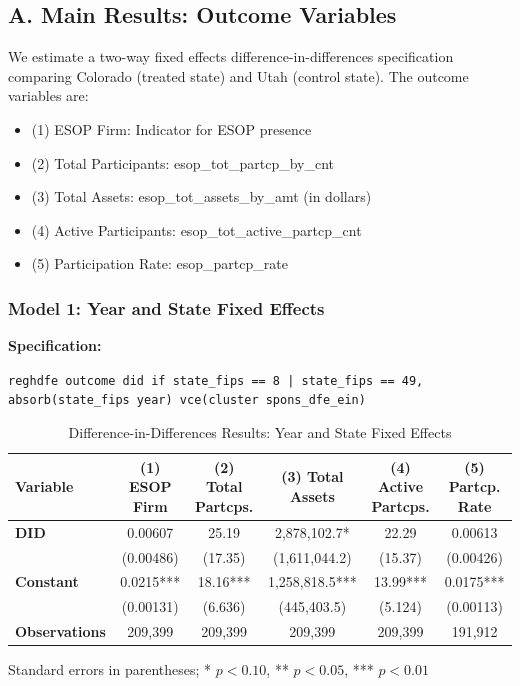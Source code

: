 \documentclass[12pt]{article}
\begin{document}
\subsection*{A. Main Results: Outcome Variables}

We estimate a two-way fixed effects difference-in-differences specification comparing Colorado (treated state) and Utah (control state). The outcome variables are:

\begin{itemize}
\item (1) ESOP Firm: Indicator for ESOP presence
\item (2) Total Participants: esop\_tot\_partcp\_by\_cnt
\item (3) Total Assets: esop\_tot\_assets\_by\_amt (in dollars)
\item (4) Active Participants: esop\_tot\_active\_partcp\_cnt
\item (5) Participation Rate: esop\_partcp\_rate
\end{itemize}

\subsubsection*{Model 1: Year and State Fixed Effects}

\textbf{Specification:}

\texttt{reghdfe outcome did if state\_fips == 8 | state\_fips == 49, \\ absorb(state\_fips year) vce(cluster spons\_dfe\_ein)}
\begin{table}[H]
\centering
\caption{Difference-in-Differences Results: Year and State Fixed Effects}
\label{tab:model1}
\footnotesize

\begin{tabular}{lccccc}
\toprule
Variable & (1) ESOP Firm & (2) Total Partcps. & (3) Total Assets & (4) Active Partcps. & (5) Partcp. Rate \\
\midrule
\textbf{DID} & 0.00607 & 25.19 & 2,878,102.7* & 22.29 & 0.00613 \\
             & (0.00486) & (17.35) & (1,611,044.2) & (15.37) & (0.00426) \\
\textbf{Constant} & 0.0215*** & 18.16*** & 1,258,818.5*** & 13.99*** & 0.0175*** \\
                  & (0.00131) & (6.636) & (445,403.5) & (5.124) & (0.00113) \\
\midrule
\textbf{Observations} & 209,399 & 209,399 & 209,399 & 209,399 & 191,912 \\
\bottomrule
\end{tabular}

\vspace{0.5em}
{\footnotesize Standard errors in parentheses; * $p<0.10$, ** $p<0.05$, *** $p<0.01$}
\end{table}
\end{document}
